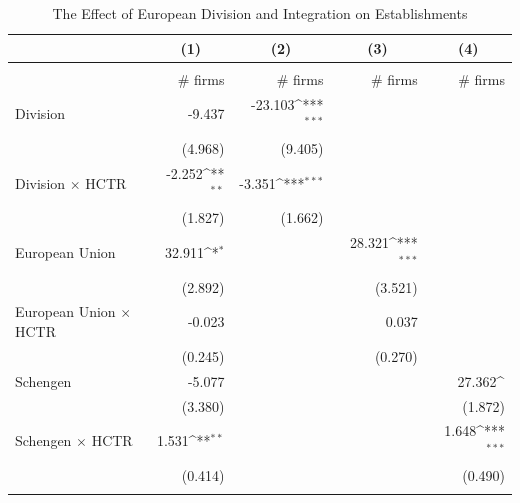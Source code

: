 \documentclass[12pt]{article}    %
\begin{document}
\begin{table}[H]  \hypertarget{Table 2.3}{}
\renewcommand\thetable{2.3}
\centering
\footnotesize
\def\sym#1{\ifmmode^{#1}\else\(^{#1}\)\fi}
\caption{ The Effect of European Division and Integration on Establishments}
\begin{tabular}{l*{4}{D{.}{.}{-1}}}
\toprule
                    &         &         &         &         \\
\toprule
    &&&\\
                    & \# firms &  \# firms & \# firms & \# firms\\ 
\midrule

Division            &       -9.437  &     -23.103\sym{***} &                     &                     \\
                    &     (4.968)         &     (9.405)         &                     &                     \\
\addlinespace
Division $\times$ HCTR&      -2.252\sym{**}         &      -3.351\sym{***} &                     &                     \\
                    &     (1.827)         &     (1.662)         &                     &                     \\

\addlinespace
European Union                &      32.911\sym{*}&                     &      28.321\sym{***}&                     \\
                    &     (2.892)         &                     &     (3.521)         &                     \\
\addlinespace
European Union $\times$ HCTR    &      -0.023         &                     &       0.037         &                     \\
                    &     (0.245)         &                     &     (0.270)         &                     \\
Schengen            &      -5.077         &                     &                     &      27.362\sym{}\\
                    &     (3.380)         &                     &                     &     (1.872)         \\
\addlinespace
Schengen $\times$ HCTR  &       1.531\sym{**}&                     &                     &       1.648\sym{***}\\
                    &     (0.414)         &                     &                     &     (0.490)         \\
\addlinespace


\end{tabular}
\end{table}
\end{document}
